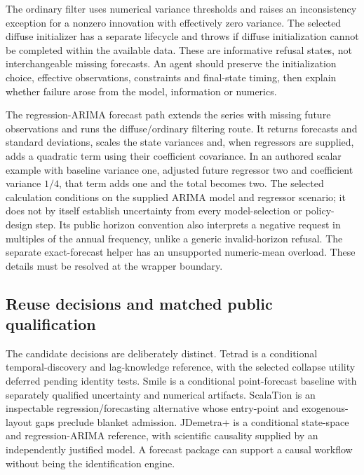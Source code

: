 The ordinary filter uses numerical variance thresholds and raises an inconsistency exception for a nonzero innovation with effectively zero variance. The selected diffuse initializer has a separate lifecycle and throws if diffuse initialization cannot be completed within the available data. These are informative refusal states, not interchangeable missing forecasts. An agent should preserve the initialization choice, effective observations, constraints and final-state timing, then explain whether failure arose from the model, information or numerics.\citep{exec25_jdyn_jdplus}

The regression-ARIMA forecast path extends the series with missing future observations and runs the diffuse/ordinary filtering route. It returns forecasts and standard deviations, scales the state variances and, when regressors are supplied, adds a quadratic term using their coefficient covariance. In an authored scalar example with baseline variance one, adjusted future regressor two and coefficient variance $1/4$, that term adds one and the total becomes two. The selected calculation conditions on the supplied ARIMA model and regressor scenario; it does not by itself establish uncertainty from every model-selection or policy-design step. Its public horizon convention also interprets a negative request in multiples of the annual frequency, unlike a generic invalid-horizon refusal. The separate exact-forecast helper has an unsupported numeric-mean overload. These details must be resolved at the wrapper boundary.\citep{exec25_jdyn_jdplus,exec25_jdyn_choice}

\subsection{Reuse decisions and matched public qualification}

The candidate decisions are deliberately distinct. Tetrad is a conditional temporal-discovery and lag-knowledge reference, with the selected collapse utility deferred pending identity tests. Smile is a conditional point-forecast baseline with separately qualified uncertainty and numerical artifacts. ScalaTion is an inspectable regression/forecasting alternative whose entry-point and exogenous-layout gaps preclude blanket admission. JDemetra+ is a conditional state-space and regression-ARIMA reference, with scientific causality supplied by an independently justified model. A forecast package can support a causal workflow without being the identification engine.\citep{exec25_jdyn_choice}

